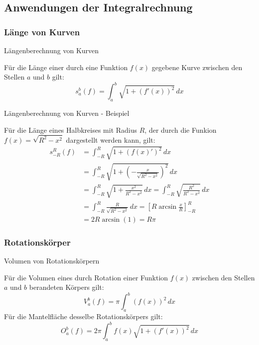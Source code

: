 \subsection{Anwendungen der Integralrechnung}
\subsubsection{Länge von Kurven}
\begin{frame}{Längenberechnung von Kurven}
\begin{definition}
	Für die Länge einer durch eine Funktion $f(x)$ gegebene Kurve zwischen den Stellen $a$ und $b$ gilt:
	\[
		s_{a}^{b}(f) = \int_{a}^{b} \sqrt{1+(f'(x))^{2}}\, dx  
	\]
\end{definition}
\end{frame}

\begin{frame}{Längenberechnung von Kurven - Beispiel}
\begin{example}
\small{	Für die Länge eines Halbkreises mit Radius $R$, der durch die Funkion $f(x)=\sqrt{R^2-x^2}$ dargestellt werden kann, gilt:
	\begin{align*}
		s_{-R}^{R}(f) & = \int_{-R}^{R} \sqrt{1+(f(x)')^{2}}\, dx \\
		& = \int_{-R}^{R} \sqrt{1+\left( -\frac{x}{\sqrt{R^2-x^2}} \right)^{2}}\, dx \\
		& = \int_{-R}^{R} \sqrt{1+\frac{x^2}{R^2-x^2}}\, dx = \int_{-R}^{R} \sqrt{\frac{R^2}{R^2-x^2}}\, dx \\
		& = \int_{-R}^{R} \frac{R}{\sqrt{R^2-x^2}}\, dx = \left[ R \arcsin \frac{x}{R} \right]_{-R}^{R} \\
		& = 2 R \arcsin(1) = R \pi	
	\end{align*}}
\end{example}
\end{frame}

\subsubsection{Rotationskörper}
\begin{frame}{Volumen von Rotationskörpern}
\begin{definition}
	Für die Volumen eines durch Rotation einer Funktion $f(x)$ zwischen den Stellen $a$ und $b$ berandeten Körpers  gilt:
	\[
		V_{a}^{b}(f) = \pi \int_{a}^{b} (f(x))^{2} \, dx  
	\]
	Für die Mantelfläche desselbe Rotationskörpers gilt:
	\[
		O_{a}^{b}(f) = 2\pi \int_{a}^{b} f(x) \sqrt{1+(f'(x))^2}\, dx
	\]
\end{definition}
\end{frame}

